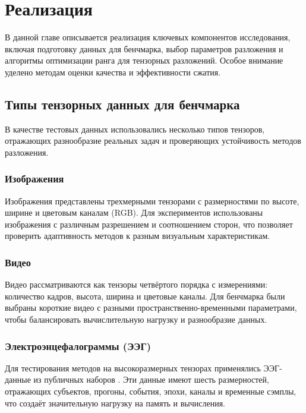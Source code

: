 \chapter{Реализация}
\label{chap:implementation}

В данной главе описывается реализация ключевых компонентов исследования, включая подготовку данных для бенчмарка, выбор параметров разложения и алгоритмы оптимизации ранга для тензорных разложений. Особое внимание уделено методам оценки качества и эффективности сжатия.

\section{Типы тензорных данных для бенчмарка}

В качестве тестовых данных использовались несколько типов тензоров, отражающих разнообразие реальных задач и проверяющих устойчивость методов разложения.

\subsection*{Изображения}

Изображения представлены трехмерными тензорами с размерностями по высоте, ширине и цветовым каналам (RGB). Для экспериментов использованы изображения с различным разрешением и соотношением сторон, что позволяет проверить адаптивность методов к разным визуальным характеристикам.

\subsection*{Видео}

Видео рассматриваются как тензоры четвёртого порядка с измерениями: количество кадров, высота, ширина и цветовые каналы. Для бенчмарка были выбраны короткие видео с разными пространственно-временными параметрами, чтобы балансировать вычислительную нагрузку и разнообразие данных.

\subsection*{Электроэнцефалограммы (ЭЭГ)}

Для тестирования методов на высокоразмерных тензорах применялись ЭЭГ-данные из публичных наборов \cite{Schalk2004BCI2000}. Эти данные имеют шесть размерностей, отражающих субъектов, прогоны, события, эпохи, каналы и временные сэмплы, что создаёт значительную нагрузку на память и вычисления.


